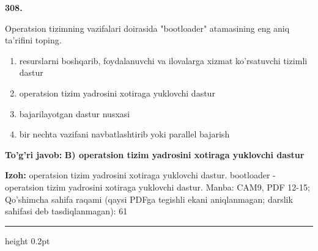 \documentclass[10pt,a4paper]{article}
\begin{document}
{\bfseries\sffamily\color{ink} 308.}
\par
Operatsion tizimning vazifalari doirasida "bootloader" atamasining eng aniq ta'rifini toping.
\begin{enumerate}[label=\Alph*),leftmargin=9mm]
\item resurslarni boshqarib, foydalanuvchi va ilovalarga xizmat ko'rsatuvchi tizimli dastur
\item operatsion tizim yadrosini xotiraga yuklovchi dastur
\item bajarilayotgan dastur nusxasi
\item bir nechta vazifani navbatlashtirib yoki parallel bajarish
\end{enumerate}
\begin{tcolorbox}[enhanced,breakable,colback=teal!4,colframe=teal!60!black,boxrule=0.45pt,arc=1.2mm,left=2.7mm,right=2.7mm,top=1.8mm,bottom=1.8mm,before skip=2mm,after skip=2mm]
{\bfseries\sffamily\color{teal}To'g'ri javob:} \textbf{B) operatsion tizim yadrosini xotiraga yuklovchi dastur}
\par\smallskip
{\bfseries Izoh:} operatsion tizim yadrosini xotiraga yuklovchi dastur. bootloader - operatsion tizim yadrosini xotiraga yuklovchi dastur. Manba: CAM9, PDF 12-15; Qo'shimcha sahifa raqami (qaysi PDFga tegishli ekani aniqlanmagan; darslik sahifasi deb tasdiqlanmagan): 61
\end{tcolorbox}
\vspace{2mm}\hrule height 0.2pt\vspace{3mm}
\end{document}
